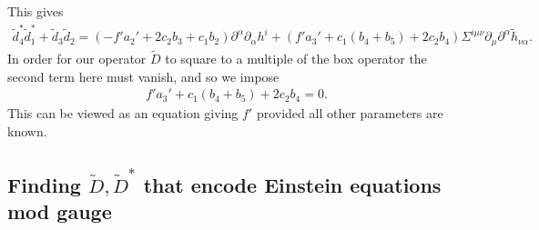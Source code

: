 \documentclass[10pt]{report}
\theoremstyle{definition}
\begin{document}
This gives
\begin{align}\nonumber
\tilde{d}_4^* \tilde{d}_1^* +\tilde{d}_3 \tilde{d}_2 =(- f' a_2' +2 c_2 b_3+ c_1 b_2) \partial^\alpha \partial_\alpha h^i
+ (f' a_3' + c_1 (b_4 +b_5) + 2 c_2 b_4)\Sigma^{i\mu\nu} \partial_\mu \partial^\alpha \tilde{h}_{\nu\alpha}.
\end{align}
In order for our operator $\tilde{D}$ to square to a multiple of the box operator the second term here must vanish, and so we impose
\begin{align}\label{f-eqn}
f' a_3' + c_1 (b_4 +b_5) + 2 c_2 b_4=0.
\end{align}
This can be viewed as an equation giving $f'$ provided all other parameters are known. 


\subsection{Finding \texorpdfstring{$\tilde{D},\tilde{D}^*$}{} that encode Einstein equations mod gauge}
\end{document}
